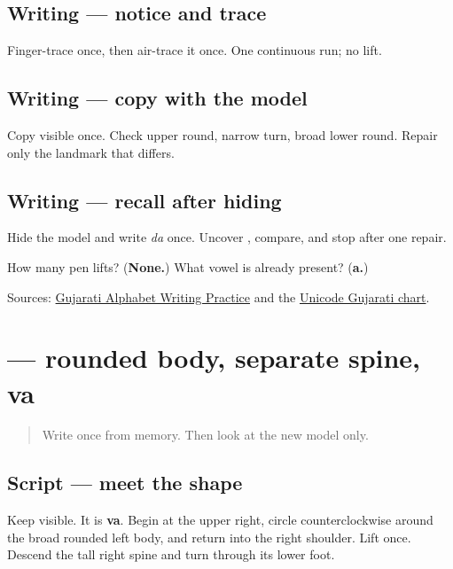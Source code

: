 \subsection*{Writing — notice and trace}

Finger-trace \textbf{} once, then air-trace it once. One continuous run; no lift.

\subsection*{Writing — copy with the model}
Copy visible \textbf{} once. Check upper round, narrow turn, broad lower round. Repair only the landmark that differs.

\subsection*{Writing — recall after hiding}
Hide the model and write \emph{da} once. Uncover \textbf{}, compare, and stop after one repair.

\begin{tcolorbox}[breakable,colback=teal!4,colframe=teal!35!black,title={Before you move on}]
How many pen lifts? (\textbf{None.}) What vowel is already present? (\textbf{a.})

Sources: \href{https://www.t30apps.com/gujarati-alphabet-writing/}{Gujarati Alphabet Writing Practice} and the \href{https://www.unicode.org/charts/PDF/U0A80.pdf}{Unicode Gujarati chart}.
\end{tcolorbox}
\section[\texorpdfstring{\gu{વ} (va)}{વ (va)}]{ — rounded body, separate spine, va}

\label{lesson:GU-W02-va}



\begin{quote}
Write \textbf{} once from memory. Then look at the new model only.
\end{quote}

\subsection*{Script — meet the shape}
Keep \textbf{} visible. It is \textbf{va}. Begin at the upper right, circle counterclockwise around the broad rounded left body, and return into the right shoulder. Lift once. Descend the tall right spine and turn through its lower foot.

